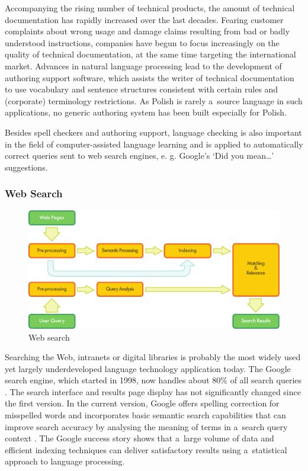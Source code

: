 \begin{multicols}{2}

Accompanying the rising number of technical products, the amount of
technical documentation has rapidly increased over the last decades.
Fearing customer complaints about wrong usage and damage claims
resulting from bad or badly understood instructions, companies have
begun to focus increasingly on the quality of technical documentation,
at the same time targeting the international market. Advances in
natural language processing lead to the development of authoring
support software, which assists the writer of technical documentation
to use vocabulary and sentence structures consistent with certain
rules and (corporate) terminology restrictions. As Polish is rarely
a~source language in such applications, no generic authoring system
has been built especially for Polish. 

Besides spell checkers and authoring support, language checking is
also important in the field of computer-assisted language learning and
is applied to automatically correct queries sent to web search
engines, e. g. Google’s ‘Did you mean…’ suggestions. 

\subsubsection{Web Search} 

\begin{figure}[t]  \center
\includegraphics[width=\textwidth]{../_media/english/web_search_architecture}
\caption{Web search} \label{fig: websearcharch_en}
 \end{figure} 

Searching the Web, intranets or digital libraries is probably the most
widely used yet largely underdeveloped language technology application
today. The Google search engine, which started in 1998, now handles
about 80\% of all search queries \cite{spi1}. The search interface and
results page display has not significantly changed since the first
version. In the current version, Google offers spelling correction for
misspelled words and incorporates basic semantic search capabilities
that can improve search accuracy by analysing the meaning of terms in
a~search query context \cite{pc1}. The Google success story shows that
a~large volume of data and efficient indexing techniques can deliver
satisfactory results using a~statistical approach to language
processing. 


\end{multicols}
